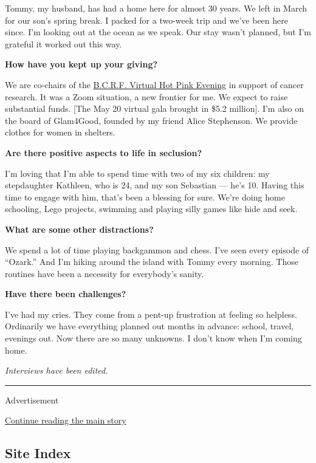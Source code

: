 Tommy, my husband, has had a home here for almost 30 years. We left in
March for our son's spring break. I packed for a two-week trip and we've
been here since. I'm looking out at the ocean as we speak. Our stay
wasn't planned, but I'm grateful it worked out this way.

\textbf{How have you kept up your giving?}

We are co-chairs of the \href{https://www.bcrf.org}{B.C.R.F. Virtual Hot
Pink Evening} in support of cancer research. It was a Zoom situation, a
new frontier for me. We expect to raise substantial funds. {[}The May 20
virtual gala brought in \$5.2 million{]}. I'm also on the board of
Glam4Good, founded by my friend Alice Stephenson. We provide clothes for
women in shelters.

\textbf{Are there positive aspects to life in seclusion?}

I'm loving that I'm able to spend time with two of my six children: my
stepdaughter Kathleen, who is 24, and my son Sebastian --- he's 10.
Having this time to engage with him, that's been a blessing for sure.
We're doing home schooling, Lego projects, swimming and playing silly
games like hide and seek.

\textbf{What are some other distractions?}

We spend a lot of time playing backgammon and chess. I've seen every
episode of ``Ozark.'' And I'm hiking around the island with Tommy every
morning. Those routines have been a necessity for everybody's sanity.

\textbf{Have there been challenges?}

I've had my cries. They come from a pent-up frustration at feeling so
helpless. Ordinarily we have everything planned out months in advance:
school, travel, evenings out. Now there are so many unknowns. I don't
know when I'm coming home.

\emph{Interviews have been edited.}

\begin{center}\rule{0.5\linewidth}{\linethickness}\end{center}

Advertisement

\protect\hyperlink{after-bottom}{Continue reading the main story}

\hypertarget{site-index}{%
\subsection{Site Index}\label{site-index}}

